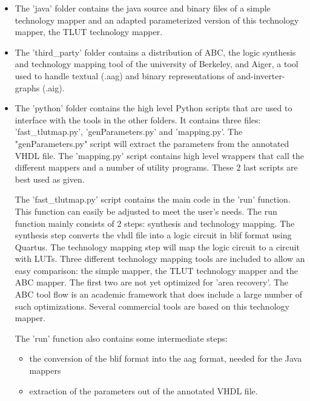\documentclass[a4paper,oneside]{memoir}
\begin{document}
\begin{itemize}
\item The 'java' folder contains the java source and binary files of a simple technology mapper and an adapted parameterized version of this technology mapper, the TLUT technology mapper.
\item The 'third\_party' folder contains a distribution of ABC, the logic synthesis and technology mapping tool of the university of Berkeley, and Aiger, a tool used to handle textual (.aag) and binary representations of and-inverter-graphs (.aig).    

\item The 'python' folder contains the high level Python scripts that are used to interface with the tools in the other folders. It contains three files: 'fast\_tlutmap.py', 'genParameters.py' and 'mapping.py'. The "genParameters.py" script will extract the parameters from the annotated VHDL file. The 'mapping.py' script contains high level wrappers that call the different mappers and a number of utility programs. These 2 last scripts are best used as given. 

The 'fast\_tlutmap.py' script contains the main code in the 'run' function. This function can easily be adjusted to meet the user's needs. The run function mainly consists of 2 steps: synthesis and technology mapping. The synthesis step converts the vhdl file into a logic circuit in blif format using Quartus. The technology mapping step will map the logic circuit to a circuit with LUTs. Three different technology mapping tools are included to allow an easy comparison: the simple mapper, the TLUT technology mapper and the ABC mapper. The first two are not yet optimized for 'area recovery'. The ABC tool flow is an academic framework that does include a large number of such optimizations. Several commercial tools are based on this technology mapper.

The 'run' function also contains some intermediate steps:
\begin{itemize} 
\item the conversion of the blif format into the aag format, needed for the Java mappers
\item extraction of the parameters out of the annotated VHDL file.
\end{itemize}

\end{itemize}

\end{document}
